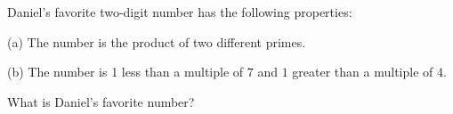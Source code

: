 Daniel's favorite two-digit number has the following properties:

(a) The number is the product of two different primes.

(b) The number is 1 less than a multiple of $7$ and $1$ greater than a multiple of $4$.

What is Daniel's favorite number?

